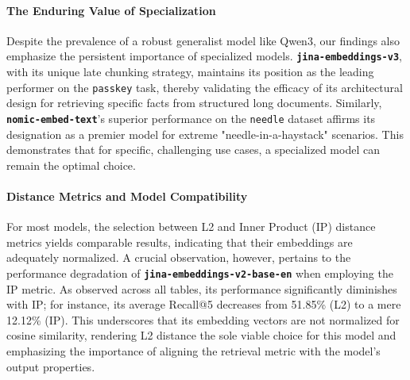 \paragraph{The Enduring Value of Specialization}
Despite the prevalence of a robust generalist model like Qwen3, our findings also emphasize the persistent importance of specialized models. \textbf{\texttt{jina-embeddings-v3}}, with its unique late chunking strategy, maintains its position as the leading performer on the \texttt{passkey} task, thereby validating the efficacy of its architectural design for retrieving specific facts from structured long documents. Similarly, \textbf{\texttt{nomic-embed-text}}'s superior performance on the \texttt{needle} dataset affirms its designation as a premier model for extreme "needle-in-a-haystack" scenarios. This demonstrates that for specific, challenging use cases, a specialized model can remain the optimal choice.

\paragraph{Distance Metrics and Model Compatibility}
For most models, the selection between L2 and Inner Product (IP) distance metrics yields comparable results, indicating that their embeddings are adequately normalized. A crucial observation, however, pertains to the performance degradation of \textbf{\texttt{jina-embeddings-v2-base-en}} when employing the IP metric. As observed across all tables, its performance significantly diminishes with IP; for instance, its average Recall@5 decreases from 51.85\% (L2) to a mere 12.12\% (IP). This underscores that its embedding vectors are not normalized for cosine similarity, rendering L2 distance the sole viable choice for this model and emphasizing the importance of aligning the retrieval metric with the model's output properties.

